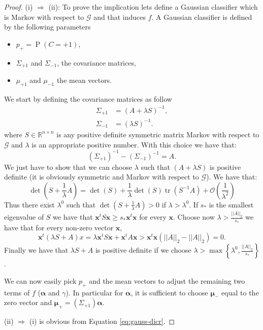 \documentclass[11pt,a4paper, twoside]{book}
\newcommand{\Pp}{\operatorname{P}}
\begin{document}
\begin{proof}
(i) $\Rightarrow$ (ii):
To prove the implication lets define a Gaussian classifier which is Markov with respect to $\mathcal{G}$ and that induces $f$. 
A Gaussian classifier is defined by the following parameters 
\begin{itemize}
\item $p_{+} = \Pp(C=+1)$,
\item $\Sigma_{+1}$ and $\Sigma_{-1}$, the covariance matrices,
\item $\mu_{+1}$ and $\mu_{-1}$ the mean vectors.
\end{itemize}
We start by defining the covariance matrices as follow
\begin{align*}
\Sigma_{+1} &= (A+\lambda S)^{-1} ,\\
\Sigma_{-1} &= (\lambda S)^{-1}.
\end{align*}
where $S \in \mathbb{R}^{n\times n}$ is any positive definite symmetric matrix Markov with respect to $\mathcal{G}$ and $\lambda$ is an appropriate positive number.
With this choice we have that:
$$\left(\Sigma_{+1}\right)^{-1} - \left(\Sigma_{-1}\right)^{-1} = A.$$
We just have to show that we can choose $\lambda$ such that $(A+\lambda S)$ is positive definite (it is obviously symmetric and Markov with respect to $\mathcal{G}$).
We have that:
$$ \det\left(S + \frac{1}{\lambda}A \right) =  \det(S) + \frac{1}{\lambda}\det(S) \operatorname{tr}(S^{-1}A) + \mathcal{O}\left( \frac{1}{\lambda^2}\right)$$
Thus there exist $\lambda^0$ such that $\det\left(S + \frac{1}{\lambda}A \right) > 0$ if $\lambda>\lambda^0$.
If $s_{*}$ is the smallest eigenvalue of $S$ we have that $ \mathbf{x}^tS\mathbf{x} \geq s_{*} \mathbf{x}^t\mathbf{x}$ for every $\mathbf{x}$.
Choose now $\lambda > \frac{||A||_{2}}{s_{*}}$ we have that for every non-zero vector $\mathbf{x}$,
$$ \mathbf{x}^t(\lambda S + A) x =  \lambda \mathbf{x}^t S \mathbf{x} + \mathbf{x}^tA\mathbf{x} >  \mathbf{x}^t\mathbf{x} \left( ||A||_{2} - ||A||_2 \right) = 0 . $$ 
Finally we have that $\lambda S + A$ is positive definite if we choose $\lambda > \max\left\{ \lambda^0, \frac{||A||_{2}}{s_{*}} \right\}$.

We can now easily pick $p_+$ and the mean vectors to adjust the remaining two terms of $f$ ($\boldsymbol{\alpha}$ and $\gamma$).
In particular for $\boldsymbol{\alpha}$, it is sufficient to choose $\boldsymbol{\mu}_{-}$ equal to the zero vector and $\boldsymbol{\mu}_{+}= (\Sigma_{+1} )\boldsymbol{\alpha}$.

(ii) $\Rightarrow$ (i) is obvious from Equation \ref{eq:gauss-dicr}.
\end{proof}
\end{document}
